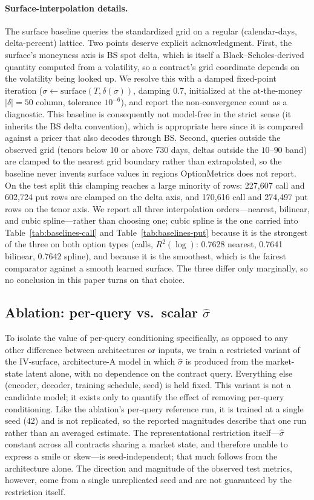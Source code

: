 \documentclass[11pt]{article}
\begin{document}
\paragraph{Surface-interpolation details.} The surface baseline queries the standardized grid on a
regular (calendar-days, delta-percent) lattice. Two points deserve explicit acknowledgment. First, the
surface's moneyness axis is BS spot delta, which is itself a Black--Scholes-derived quantity computed
from a volatility, so a contract's grid coordinate depends on the volatility being looked up. We
resolve this with a damped fixed-point iteration ($\sigma \leftarrow \text{surface}(T, \delta(\sigma))$,
damping 0.7, initialized at the at-the-money $|\delta| = 50$ column, tolerance $10^{-6}$), and report
the non-convergence count as a diagnostic. This baseline is consequently not model-free in the strict
sense (it inherits the BS delta convention), which is appropriate here since it is compared
against a pricer that also decodes through BS. Second, queries outside the observed grid (tenors below
10 or above 730 days, deltas outside the $10$--$90$ band) are clamped to the nearest grid boundary
rather than extrapolated, so the baseline never invents surface values in regions OptionMetrics does
not report. On the test split this clamping reaches a large minority of rows: 227{,}607 call and
602{,}724 put rows are clamped on the delta axis, and 170{,}616 call and 274{,}497 put rows on the
tenor axis. We report all
three interpolation orders---nearest, bilinear, and cubic spline---rather than choosing one; cubic
spline is the one carried into Table~\ref{tab:baselines-call} and Table~\ref{tab:baselines-put} because
it is the strongest of the three on both option types (calls, $R^2(\log)$: 0.7628 nearest, 0.7641
bilinear, 0.7642 spline), and because it is the smoothest, which is the fairest comparator against a
smooth learned surface. The three differ only marginally, so no conclusion in this paper turns on that
choice.

\subsection{Ablation: per-query vs.\ scalar $\hat\sigma$}
\label{sec:ablation-method}
To isolate the value of per-query conditioning specifically, as opposed to any other difference between
architectures or inputs, we train a restricted variant of the IV-surface, architecture-A model in which
$\hat\sigma$ is produced from the market-state latent alone, with no dependence on the contract query.
Everything else (encoder, decoder, training schedule, seed) is held fixed. This variant is not a
candidate model; it exists only to quantify the effect of removing per-query conditioning. Like the
ablation's per-query reference run, it is trained at a single seed (42) and is not replicated, so the
reported magnitudes describe that one run rather than an averaged estimate. The representational
restriction itself---$\hat\sigma$ constant across all contracts sharing a market state, and therefore
unable to express a smile or skew---is seed-independent; that much follows from the architecture
alone. The direction and magnitude of the observed test metrics, however, come from a single
unreplicated seed and are not guaranteed by the restriction itself.
\end{document}
